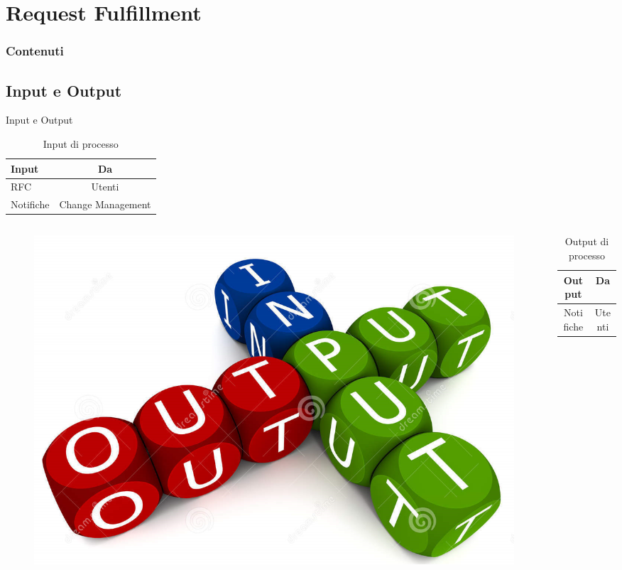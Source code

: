 %
\section{Request Fulfillment}
\frame
{
\frametitle{Contenuti}
\tableofcontents[currentsection]
}

\subsection*{Input e Output}
\begin{frame}{Input e Output}
\begin{table}
\begin{tabular}{ l | c }
\textbf{Input} & \textbf{Da}\\
\hline
RFC & Utenti\\
Notifiche & Change Management\\
\end{tabular}
\caption{Input di processo}
\end{table}
\begin{columns}
\begin{column}{0.3\textwidth}
\begin{figure}
\includegraphics[scale=0.1]{Images/Input_output.png}
\end{figure}
\end{column}
\begin{column}{0.7\textwidth}
\begin{table}
\begin{tabular}{ c | c }
\textbf{Output} & \textbf{Da}\\
\hline
Notifiche & Utenti\\
\end{tabular}
\caption{Output di processo}
\end{table}
\end{column}
\end{columns}
\end{frame}

